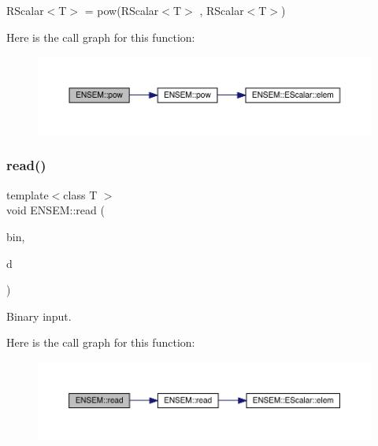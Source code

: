 R\+Scalar$<$\+T$>$ = pow(\+R\+Scalar$<$\+T$>$ , R\+Scalar$<$\+T$>$) 

Here is the call graph for this function\+:\nopagebreak
\begin{figure}[H]
\begin{center}
\leavevmode
\includegraphics[width=350pt]{d9/ded/group__rscalar_gae9777be3e406f64a9a70f5a97526102a_cgraph}
\end{center}
\end{figure}
\mbox{\label{group__rscalar_gaccfe83f3d505a988121c117c9383f188}} 
\subsubsection{\texorpdfstring{read()}{read()}\hspace{0.1cm}{\footnotesize\ttfamily [1/2]}}
{\footnotesize\ttfamily template$<$class T $>$ \\
void E\+N\+S\+E\+M\+::read (\begin{DoxyParamCaption}\item[{\mbox{\hyperlink{classADATIO_1_1BinaryReader}{A\+D\+A\+T\+I\+O\+::\+Binary\+Reader}} \&}]{bin,  }\item[{\mbox{\hyperlink{classENSEM_1_1RScalar}{R\+Scalar}}$<$ T $>$ \&}]{d }\end{DoxyParamCaption})}



Binary input. 

Here is the call graph for this function\+:\nopagebreak
\begin{figure}[H]
\begin{center}
\leavevmode
\includegraphics[width=350pt]{d9/ded/group__rscalar_gaccfe83f3d505a988121c117c9383f188_cgraph}
\end{center}
\end{figure}
\mbox{\label{group__rscalar_ga254ddc2517282f105035865bc1e227dc}} 

